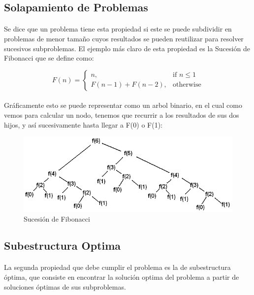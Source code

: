 \documentclass{article}
\begin{document}
	\subsection{Solapamiento de Problemas}
		\paragraph{}
		Se dice que un problema tiene esta propiedad si este se puede subdividir en problemas de menor tamaño cuyos resultados se pueden reutilizar para resolver sucesivos subproblemas. El ejemplo más claro de esta propiedad es la Sucesión de Fibonacci que se define como:
	
		\[
   		 F(n)= 
			\begin{cases}
    				n,				& \text{if } n\leq 1\\
    				F(n-1)+F(n-2),		& \text{otherwise}
			\end{cases}
		\]
		
		\paragraph{}
		Gráficamente esto se puede representar como un arbol binario, en el cual como vemos para calcular un nodo, tenemos que recurrir a los resultados de sus dos hijos, y así sucesivamente hasta llegar a F(0) o F(1):
		
		\begin{figure}[H]
				\centering
				\includegraphics[width=120mm]{../res/fibonacci-sequence.png}
				\caption{Sucesión de Fibonacci \label{example_border}}
		\end{figure}

	\subsection{Subestructura Optima}
		\paragraph{}
		La segunda propiedad que debe cumplir el problema es la de subestructura óptima, que consiste en encontrar la solución optima del problema a partir de soluciones óptimas de sus subproblemas.
\end{document}

